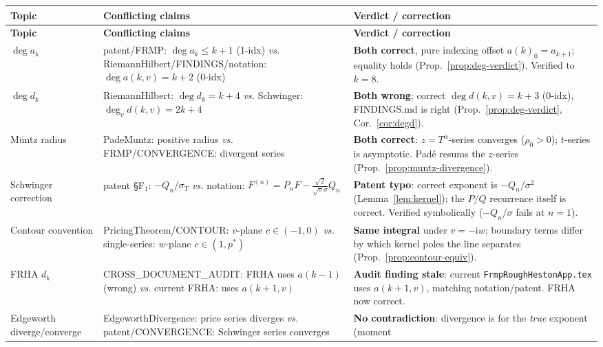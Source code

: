\documentclass[11pt]{article}
\DeclareMathOperator{\dg}{deg}
\newcommand{\Ii}{\mathrm{i}}
\theoremstyle{plain}
\theoremstyle{definition}
\theoremstyle{remark}
\begin{document}
{\small
\begin{longtable}{@{}>{\raggedright\arraybackslash}p{}
                     >{\raggedright\arraybackslash}p{}
                     >{\raggedright\arraybackslash}p{}@{}}
\toprule
\textbf{Topic} & \textbf{Conflicting claims} & \textbf{Verdict / correction}\\
\midrule
\endfirsthead
\toprule
\textbf{Topic} & \textbf{Conflicting claims} & \textbf{Verdict / correction}\\
\midrule
\endhead
\bottomrule
\endfoot
$\dg a_k$ &
patent/FRMP: $\dg a_k\le k+1$ (1-idx) \emph{vs.}
RiemannHilbert/FINDINGS/notation: $\dg a(k,v)=k+2$ (0-idx) &
\textbf{Both correct}, pure indexing offset $a(k)_{0}=a_{k+1}$;
equality holds (Prop.~\ref{prop:deg-verdict}). Verified to $k=8$.\\
\addlinespace
$\dg d_k$ &
RiemannHilbert: $\dg d_k=k+4$ \emph{vs.}
Schwinger: $\dg_v d(k,v)=2k+4$ &
\textbf{Both wrong}; correct $\dg d(k,v)=k+3$ (0-idx), FINDINGS.md is right
(Prop.~\ref{prop:deg-verdict}, Cor.~\ref{cor:degd}).\\
\addlinespace
Müntz radius &
PadeMuntz: positive radius \emph{vs.}
FRMP/CONVERGENCE: divergent series &
\textbf{Both correct}: $z=T^\alpha$-series converges ($\rho_0>0$);
$t$-series is asymptotic. Padé resums the $z$-series
(Prop.~\ref{prop:muntz-divergence}).\\
\addlinespace
Schwinger correction &
patent \S F$_1$: $-Q_n/\sigma_T$ \emph{vs.}
notation: $F^{(n)}=P_nF-\tfrac{\sqrt2}{\sqrt\pi\sigma}Q_n$ &
\textbf{Patent typo}: correct exponent is $-Q_n/\sigma^2$
(Lemma~\ref{lem:kernel}); the $P/Q$ recurrence itself is correct. Verified
symbolically ($-Q_n/\sigma$ fails at $n=1$).\\
\addlinespace
Contour convention &
PricingTheorem/CONTOUR: $v$-plane $c\in(-1,0)$ \emph{vs.}
single-series: $w$-plane $c\in(1,p^\ast)$ &
\textbf{Same integral} under $v=-\Ii w$; boundary terms differ by which kernel
poles the line separates (Prop.~\ref{prop:contour-equiv}).\\
\addlinespace
FRHA $d_k$ &
CROSS\_DOCUMENT\_AUDIT: FRHA uses $a(k-1)$ (wrong) \emph{vs.}
current FRHA: uses $a(k+1,v)$ &
\textbf{Audit finding stale}: current \texttt{FrmpRoughHestonApp.tex} uses
$a(k+1,v)$, matching notation/patent. FRHA now correct.\\
\addlinespace
Edgeworth diverge/converge &
EdgeworthDivergence: price series diverges \emph{vs.}
patent/CONVERGENCE: Schwinger series converges &
\textbf{No contradiction}: divergence is for the \emph{true} exponent (moment

\end{longtable}}
\end{document}

